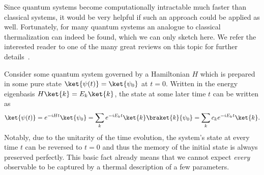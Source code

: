 Since quantum systems become computationally intractable much faster than classical systems, it would be very helpful if such an approach could be applied as well. Fortunately, for many quantum systems an analogue to classical thermalization can indeed be found, which we can only sketch here.
We refer the interested reader to one of the many great reviews on this topic for further details~\cite{gogolinEquilibrationThermalisationEmergence2016,dalessioQuantumChaosEigenstate2016,deutschEigenstateThermalizationHypothesis2018,moriThermalizationPrethermalizationIsolated2018}.

Consider some quantum system governed by a Hamiltonian $H$ which is prepared in some pure state $\ket{\psi(t)}=\ket{\psi_0}$ at $t=0$. Written in the energy eigenbasis $H\ket{k}=E_k\ket{k}$, the state at some later time $t$ can be written as
\begin{equation}
	\ket{\psi(t)} = e^{-iHt}\ket{\psi_0} = \sum_k e^{-iE_kt}\ket{k}\braket{k}{\psi_0}	= \sum_k c_k e^{-iE_kt}\ket{k}.
\end{equation}
Notably, due to the unitarity of the time evolution, the system's state at every time $t$ can be reversed to $t=0$ and thus the memory of the initial state is always preserved perfectly. This basic fact already means that we cannot expect \emph{every} observable to be captured by a thermal description of a few parameters.

